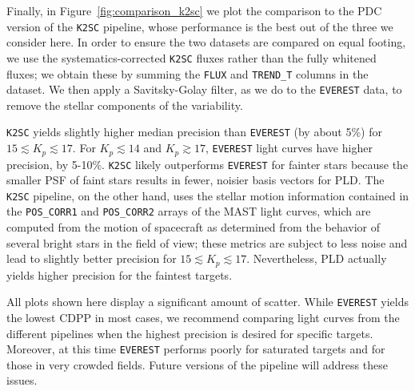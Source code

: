 \documentclass[]{emulateapj}
\begin{document}
Finally, in Figure~\ref{fig:comparison_k2sc} we plot the comparison to the PDC version
of the \texttt{K2SC}
pipeline, whose performance is the best out of the three we consider here. In order to 
ensure the two datasets are compared on equal footing, we use the systematics-corrected
\texttt{K2SC} fluxes rather than the fully whitened fluxes; we obtain these by
summing the \texttt{FLUX} and \texttt{TREND\_T} columns in the dataset. We then apply
a Savitsky-Golay filter, as we do to the \texttt{EVEREST} data, to remove the stellar 
components of the variability.

\texttt{K2SC} yields slightly higher median precision than \texttt{EVEREST} (by about 5\%) for 
$15 \lesssim K_p \lesssim 17$. For $K_p \lesssim 14$ and $K_p \gtrsim 17$, \texttt{EVEREST}
light curves have higher precision, by 5-10\%. \texttt{K2SC} likely outperforms
\texttt{EVEREST} for fainter stars because the smaller PSF of faint
stars results in fewer, noisier basis vectors for PLD. The \texttt{K2SC} pipeline, on 
the other hand, uses the stellar motion information contained in the \texttt{POS\_CORR1}
and \texttt{POS\_CORR2} arrays of the MAST light curves, which are computed from the
motion of spacecraft as determined from the behavior of several bright stars in the field
of view; these metrics are subject to less noise and lead to slightly better precision
for $15 \lesssim K_p \lesssim 17$. Nevertheless, PLD actually yields higher precision 
for the faintest targets.

All plots shown here display a significant amount of scatter. While \texttt{EVEREST}
yields the lowest CDPP in most cases, we recommend comparing light curves from
the different pipelines when the highest precision is desired for specific targets.
Moreover, at this time \texttt{EVEREST} performs poorly for saturated
targets and for those in very crowded fields. Future versions of the pipeline will address
these issues.
\end{document}
